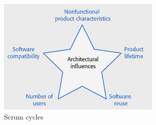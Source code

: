 \documentclass[10pt,a4paper]{report}
\begin{document}
 \begin{figure}[h]
 	\centering
 	\includegraphics[width=0.7\textwidth]{image24}
 	\caption{Scrum cycles}
 	\label{image24}
 \end{figure}
\end{document}
